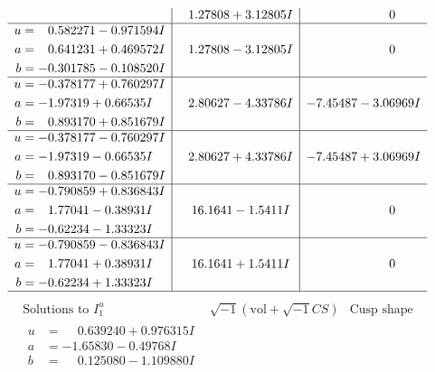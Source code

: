 \documentclass[1p]{elsarticle_modified}
\theoremstyle{definition}
\newcommand{\I}{\sqrt{-1}}
\begin{document}
$$\begin{array}{c|c|c}
 & \phantom{-}1.27808 + 3.12805 I & \phantom{-0.000000 } 0 \\ \hline\begin{aligned}
u &= \phantom{-}0.582271 - 0.971594 I \\
a &= \phantom{-}0.641231 + 0.469572 I \\
b &= -0.301785 - 0.108520 I\end{aligned}
 & \phantom{-}1.27808 - 3.12805 I & \phantom{-0.000000 } 0 \\ \hline\begin{aligned}
u &= -0.378177 + 0.760297 I \\
a &= -1.97319 + 0.66535 I \\
b &= \phantom{-}0.893170 + 0.851679 I\end{aligned}
 & \phantom{-}2.80627 - 4.33786 I & -7.45487 - 3.06969 I \\ \hline\begin{aligned}
u &= -0.378177 - 0.760297 I \\
a &= -1.97319 - 0.66535 I \\
b &= \phantom{-}0.893170 - 0.851679 I\end{aligned}
 & \phantom{-}2.80627 + 4.33786 I & -7.45487 + 3.06969 I \\ \hline\begin{aligned}
u &= -0.790859 + 0.836843 I \\
a &= \phantom{-}1.77041 - 0.38931 I \\
b &= -0.62234 - 1.33323 I\end{aligned}
 & \phantom{-}16.1641 - 1.5411 I & \phantom{-0.000000 } 0 \\ \hline\begin{aligned}
u &= -0.790859 - 0.836843 I \\
a &= \phantom{-}1.77041 + 0.38931 I \\
b &= -0.62234 + 1.33323 I\end{aligned}
 & \phantom{-}16.1641 + 1.5411 I & \phantom{-0.000000 } 0\\
 \hline 
 \end{array}$$\newpage$$\begin{array}{c|c|c}  
\text{Solutions to }I^u_{1}& \I (\text{vol} + \sqrt{-1}CS) & \text{Cusp shape}\\
 \hline 
\begin{aligned}
u &= \phantom{-}0.639240 + 0.976315 I \\
a &= -1.65830 - 0.49768 I \\
b &= \phantom{-}0.125080 - 1.109880 I\end{aligned}

\end{array}$$
\end{document}
